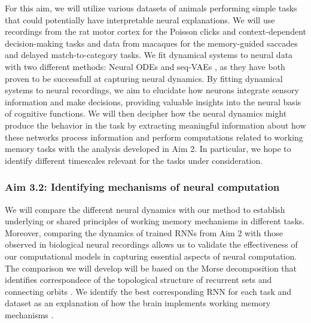 \documentclass[12pt,letterpaper, onecolumn]{article}
\theoremstyle{definition}
\theoremstyle{remark}
\begin{document}
For this aim, we will utilize various datasets of animals performing simple tasks that could potentially have interpretable neural explanations.
We will use recordings from the rat motor cortex for the Poisson clicks and context-dependent decision-making tasks and data from macaques for the memory-guided saccades and delayed match-to-category tasks.
%
We fit dynamical systems to neural data \citep{Zhao2016d} with two different methods:
 Neural ODEs \citep{kim2021inferring} and 
 seq-VAEs \citep{pandarinath2018inferring}, as they have both proven to be successfull at capturing neural dynamics.
By fitting dynamical systems to neural recordings, we aim to elucidate how neurons integrate sensory information and make decisions, providing valuable insights into the neural basis of cognitive functions.
We will then decipher how the neural dynamics might produce the behavior in the task by extracting meaningful information about how these networks process information and perform computations related to working memory tasks with the analysis developed in Aim 2. 
In particular, we hope to identify different timescales relevant for the tasks under consideration.

\subsubsection*{Aim 3.2: Identifying mechanisms of neural computation}
We will compare the different neural dynamics with our method to establish underlying or shared principles of working memory mechanisms in different tasks.
Moreover, comparing the dynamics of trained RNNs from Aim 2 with those observed in biological neural recordings allows us to validate the effectiveness of our computational models in capturing essential aspects of neural computation.
 The comparison we will develop will be based on the Morse decomposition that identifies correspondece of the topological structure of recurrent sets and connecting orbits \citep{arai2009database, kaczynski2004computational}.
We identify the best corresponding RNN for each task and dataset as an explanation of how the brain implements working memory mechanisms \citep{levenstein2023}.
 



\newpage
\printbibliography
\end{document}
